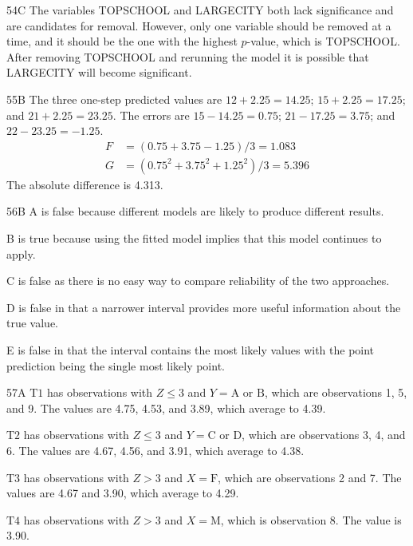 \begin{solution}{54}{C}
The variables TOPSCHOOL and LARGECITY both lack significance and are candidates for removal. However, only one variable should be removed at a time, and it should be the one with the highest $p$-value, which is TOPSCHOOL. After removing TOPSCHOOL and rerunning the model it is possible that LARGECITY will become significant.
\end{solution}

\begin{solution}{55}{B}
The three one-step predicted values are $12 + 2.25 = 14.25$; $15 + 2.25 = 17.25$; and $21 + 2.25 = 23.25$. The errors are $15 - 14.25 = 0.75$; $21 - 17.25 = 3.75$; and $22 - 23.25 = -1.25$.
\begin{align*}
F &= (0.75 + 3.75 - 1.25)/3 = 1.083 \\
G &= (0.75^2 + 3.75^2 + 1.25^2)/3 = 5.396
\end{align*}
The absolute difference is 4.313.
\end{solution}

\begin{solution}{56}{B}
A is false because different models are likely to produce different results.

B is true because using the fitted model implies that this model continues to apply.

C is false as there is no easy way to compare reliability of the two approaches.

D is false in that a narrower interval provides more useful information about the true value.

E is false in that the interval contains the most likely values with the point prediction being the single most likely point.
\end{solution}

\begin{solution}{57}{A}
$\mathrm{T1}$ has observations with $Z \leqslant 3$ and $Y = \mathrm{A}$ or $\mathrm{B}$, which are observations 1, 5, and 9. The values are 4.75, 4.53, and 3.89, which average to 4.39.

$\mathrm{T2}$ has observations with $Z \leqslant 3$ and $Y = \mathrm{C}$ or $\mathrm{D}$, which are observations 3, 4, and 6. The values are 4.67, 4.56, and 3.91, which average to 4.38.

$\mathrm{T3}$ has observations with $Z > 3$ and $X = \mathrm{F}$, which are observations 2 and 7. The values are 4.67 and 3.90, which average to 4.29.

$\mathrm{T4}$ has observations with $Z > 3$ and $X = \mathrm{M}$, which is observation 8. The value is 3.90.
\end{solution}


